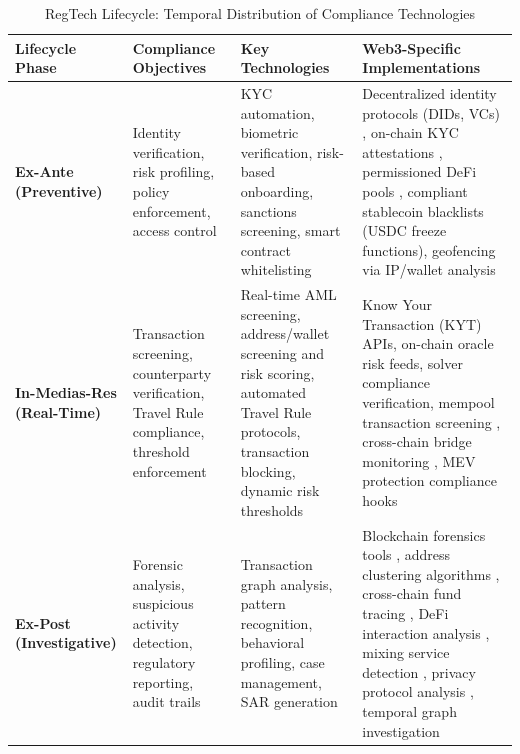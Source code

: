 \documentclass[conference,compsoc]{IEEEtran}
\begin{document}
\begin{table}[t]
\centering
\caption{RegTech Lifecycle: Temporal Distribution of Compliance Technologies}
\label{tab:regtech_lifecycle}
\scriptsize
\begin{tabular}{p{2.5cm}p{3.5cm}p{4.0cm}p{5.5cm}}
\toprule
\textbf{Lifecycle Phase} & \textbf{Compliance Objectives} & \textbf{Key Technologies} & \textbf{Web3-Specific Implementations} \\
\midrule
\textbf{Ex-Ante (Preventive)} & Identity verification, risk profiling, policy enforcement, access control \cite{financialactiontaskforcefatf2012internationalstandardscombating,force2021updatedguidanceriskbased} & KYC automation, biometric verification, risk-based onboarding, sanctions screening, smart contract whitelisting \cite{charoenwong2024regtechtechnologydrivencompliance} & Decentralized identity protocols (DIDs, VCs) \cite{reed2022decentralizedidentifiersdids,camenisch2001efficientsystemnontransferable}, on-chain KYC attestations \cite{yang2024researchidentitydata}, permissioned DeFi pools \cite{ling2025sokstablecoindesigns}, compliant stablecoin blacklists (USDC freeze functions), geofencing via IP/wallet analysis \\
\midrule
\textbf{In-Medias-Res (Real-Time)} & Transaction screening, counterparty verification, Travel Rule compliance, threshold enforcement \cite{force2021opportunitieschallengesnew} & Real-time AML screening, address/wallet screening and risk scoring, automated Travel Rule protocols, transaction blocking, dynamic risk thresholds \cite{moser2014riskscoringbitcoin,weber2019antimoneylaunderingbitcoin} & Know Your Transaction (KYT) APIs, on-chain oracle risk feeds, solver compliance verification, mempool transaction screening \cite{daian2020flashboys20}, cross-chain bridge monitoring \cite{zhang2024securitycrosschainbridges,li2025blockchaincrosschainbridge}, MEV protection compliance hooks \cite{qin2022quantifyingblockchainextractable} \\
\midrule
\textbf{Ex-Post (Investigative)} & Forensic analysis, suspicious activity detection, regulatory reporting, audit trails \cite{financialactiontaskforcefatf2012internationalstandardscombating} & Transaction graph analysis, pattern recognition, behavioral profiling, case management, SAR generation \cite{petterssonruiz2022combatingmoneylaundering,pocher2023detectinganomalouscryptocurrency} & Blockchain forensics tools \cite{meiklejohn2013fistfulbitcoinscharacterizing,yousaf2019tracingtransactionscryptocurrency}, address clustering algorithms \cite{reid2013analysisanonymitybitcoin,ron2013quantitativeanalysisfull}, cross-chain fund tracing \cite{zamyatin2021sokcommunicationdistributed}, DeFi interaction analysis \cite{chen2020understandingethereumgraph,sun2025ethereumfrauddetection}, mixing service detection \cite{wu2021detectingmixingservices}, privacy protocol analysis \cite{kappos2018empiricalanalysisanonymity,kumar2017traceabilityanalysismoneros}, temporal graph investigation \cite{wu2023tracerscalablegraphbased} \\
\bottomrule
\end{tabular}
\end{table}
\end{document}
